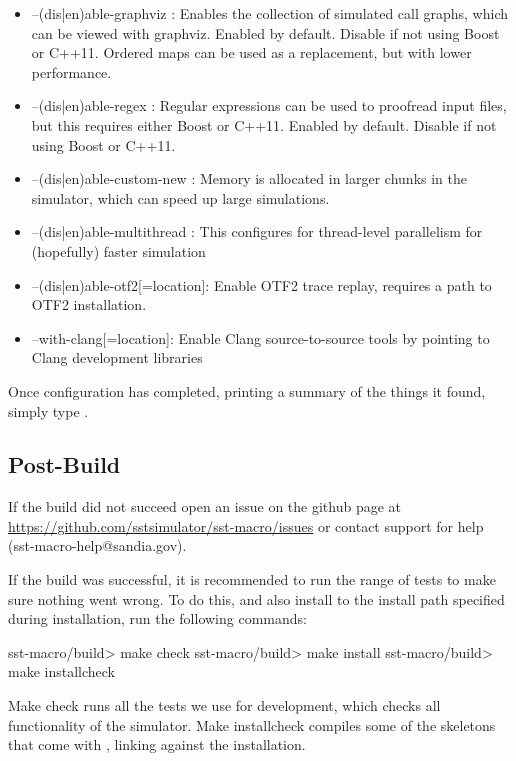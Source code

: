 \begin{itemize}
\item --(dis|en)able-graphviz : Enables the collection of simulated call graphs, which can be viewed with graphviz.
Enabled by default. Disable if not using Boost or C++11. Ordered maps can be used as a replacement, but with lower performance.
\item --(dis|en)able-regex : Regular expressions can be used to proofread input files, but this requires either Boost or C++11.
Enabled by default. Disable if not using Boost or C++11.
\item --(dis|en)able-custom-new : Memory is allocated in larger chunks in the simulator, which can speed up large simulations.
\item --(dis|en)able-multithread : This configures for thread-level parallelism for (hopefully) faster simulation
\item --(dis|en)able-otf2[=location]: Enable OTF2 trace replay, requires a path to OTF2 installation.
\item --with-clang[=location]: Enable Clang source-to-source tools by pointing to Clang development libraries
\end{itemize}

Once configuration has completed, printing a summary of the things it found, simply type .  

\subsection{Post-Build}
\label{subsec:postbuild}

If the build did not succeed open an issue on the github page at \url{https://github.com/sstsimulator/sst-macro/issues} or contact \sstmacro support for help (sst-macro-help@sandia.gov).

If the build was successful, it is recommended to run the range of tests to make sure nothing went wrong.  
To do this, and also install \sstmacro  to the install path specified during installation, run the following commands:

\begin{ShellCmd}
sst-macro/build> make check
sst-macro/build> make install
sst-macro/build> make installcheck
\end{ShellCmd}
Make check runs all the tests we use for development, which checks all functionality of the simulator.  
Make installcheck compiles some of the skeletons that come with \sstmacro, linking against the installation.  

